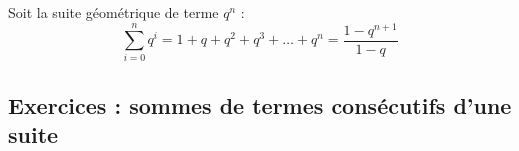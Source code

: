 \documentclass[main.tex]{subfiles}
\begin{document}
\begin{proposition} Soit la suite géométrique de terme $q^n$ :
	\setlength{\abovedisplayskip}{3pt}
	\setlength{\belowdisplayskip}{3pt} 
	$$
	\sum_{i=0}^n q^i = 1+q+q^2+q^3+\ldots+q^n= \frac{1-q^{n+1}}{1-q}
	$$ 
\end{proposition}
%	



%	 
\newpage 
{}  
\pagestyle{scrheadings} %
\onehalfspacing  
\subsection{Exercices : sommes de termes consécutifs d'une suite}
\end{document}
